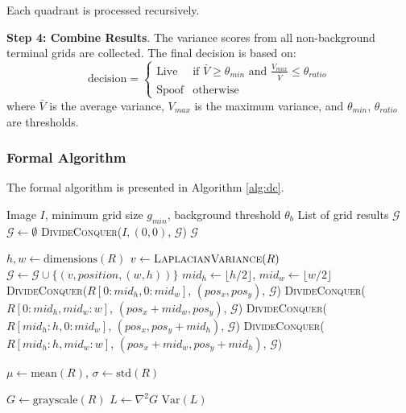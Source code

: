 \documentclass[conference]{IEEEtran}
\begin{document}
Each quadrant is processed recursively.

\textbf{Step 4: Combine Results}. The variance scores from all non-background terminal grids are collected. The final decision is based on:
\begin{equation}
    \text{decision} = \begin{cases}
        \text{Live} & \text{if } \bar{V} \geq \theta_{min} \text{ and } \frac{V_{max}}{\bar{V}} \leq \theta_{ratio} \\
        \text{Spoof} & \text{otherwise}
    \end{cases}
\end{equation}
where $\bar{V}$ is the average variance, $V_{max}$ is the maximum variance, and $\theta_{min}$, $\theta_{ratio}$ are thresholds.

\subsubsection{Formal Algorithm}

The formal algorithm is presented in Algorithm \ref{alg:dc}.

\begin{algorithm}[htbp]
\caption{Divide and Conquer for Facial Image Segmentation}
\label{alg:dc}
\begin{algorithmic}[1]
\Require Image $I$, minimum grid size $g_{min}$, background threshold $\theta_b$
\Ensure List of grid results $\mathcal{G}$
\State $\mathcal{G} \gets \emptyset$
\State {} \textsc{DivideConquer}($I, (0,0)$, $\mathcal{G}$)
\State \Return $\mathcal{G}$

    \State $h, w \gets \text{dimensions}(R)$
            \State \Return {}
        \EndIf
        \State $v \gets \textsc{LaplacianVariance}(R)$
        \State $\mathcal{G} \gets \mathcal{G} \cup \{(v, position, (w,h))\}$
        \State \Return
    \EndIf
    \State $mid_h \gets \lfloor h/2 \rfloor$, $mid_w \gets \lfloor w/2 \rfloor$
    \State \textsc{DivideConquer}($R[0:mid_h, 0:mid_w]$, $(pos_x, pos_y)$, $\mathcal{G}$)
    \State \textsc{DivideConquer}($R[0:mid_h, mid_w:w]$, $(pos_x + mid_w, pos_y)$, $\mathcal{G}$)
    \State \textsc{DivideConquer}($R[mid_h:h, 0:mid_w]$, $(pos_x, pos_y + mid_h)$, $\mathcal{G}$)
    \State \textsc{DivideConquer}($R[mid_h:h, mid_w:w]$, $(pos_x + mid_w, pos_y + mid_h)$, $\mathcal{G}$)
\EndProcedure

    \State $\mu \gets \text{mean}(R)$, $\sigma \gets \text{std}(R)$
        \State \Return {}
    \EndIf
    \State \Return {}
\EndProcedure

    \State $G \gets \text{grayscale}(R)$
    \State $L \gets \nabla^2 G$ 
    \State \Return $\text{Var}(L)$
\EndProcedure
\end{algorithmic}
\end{algorithm}
\end{document}
